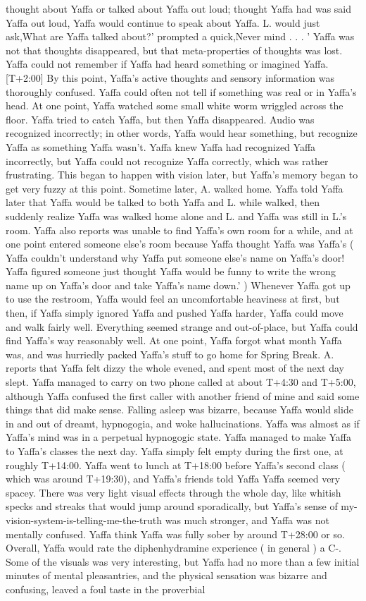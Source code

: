 \documentclass[12pt]{book}
\begin{document}
thought about Yaffa or talked about Yaffa out loud; thought Yaffa had was said Yaffa out loud, Yaffa would continue to speak about Yaffa. L. would just ask,What are Yaffa talked about?' prompted a quick,Never mind . . .  ' Yaffa was not that thoughts disappeared, but that meta-properties of thoughts was lost. Yaffa could not remember if Yaffa had heard something or imagined Yaffa. [T+2:00] By this point, Yaffa's active thoughts and sensory information was thoroughly confused. Yaffa could often not tell if something was real or in Yaffa's head. At one point, Yaffa watched some small white worm wriggled across the floor. Yaffa tried to catch Yaffa, but then Yaffa disappeared. Audio was recognized incorrectly; in other words, Yaffa would hear something, but recognize Yaffa as something Yaffa wasn't. Yaffa knew Yaffa had recognized Yaffa incorrectly, but Yaffa could not recognize Yaffa correctly, which was rather frustrating. This began to happen with vision later, but Yaffa's memory began to get very fuzzy at this point. Sometime later, A. walked home. Yaffa told Yaffa later that Yaffa would be talked to both Yaffa and L. while walked, then suddenly realize Yaffa was walked home alone and L. and Yaffa was still in L.'s room. Yaffa also reports was unable to find Yaffa's own room for a while, and at one point entered someone else's room because Yaffa thought Yaffa was Yaffa's ( Yaffa couldn't understand why Yaffa put someone else's name on Yaffa's door! Yaffa figured someone just thought Yaffa would be funny to write the wrong name up on Yaffa's door and take Yaffa's name down.' ) Whenever Yaffa got up to use the restroom, Yaffa would feel an uncomfortable heaviness at first, but then, if Yaffa simply ignored Yaffa and pushed Yaffa harder, Yaffa could move and walk fairly well. Everything seemed strange and out-of-place, but Yaffa could find Yaffa's way reasonably well. At one point, Yaffa forgot what month Yaffa was, and was hurriedly packed Yaffa's stuff to go home for Spring Break. A. reports that Yaffa felt dizzy the whole evened, and spent most of the next day slept. Yaffa managed to carry on two phone called at about T+4:30 and T+5:00, although Yaffa confused the first caller with another friend of mine and said some things that did make sense. Falling asleep was bizarre, because Yaffa would slide in and out of dreamt, hypnogogia, and woke hallucinations. Yaffa was almost as if Yaffa's mind was in a perpetual hypnogogic state. Yaffa managed to make Yaffa to Yaffa's classes the next day. Yaffa simply felt empty during the first one, at roughly T+14:00. Yaffa went to lunch at T+18:00 before Yaffa's second class ( which was around T+19:30), and Yaffa's friends told Yaffa Yaffa seemed very spacey. There was very light visual effects through the whole day, like whitish specks and streaks that would jump around sporadically, but Yaffa's sense of my-vision-system-is-telling-me-the-truth was much stronger, and Yaffa was not mentally confused. Yaffa think Yaffa was fully sober by around T+28:00 or so. Overall, Yaffa would rate the diphenhydramine experience ( in general ) a C-. Some of the visuals was very interesting, but Yaffa had no more than a few initial minutes of mental pleasantries, and the physical sensation was bizarre and confusing, leaved a foul taste in the proverbial 
\end{document}
